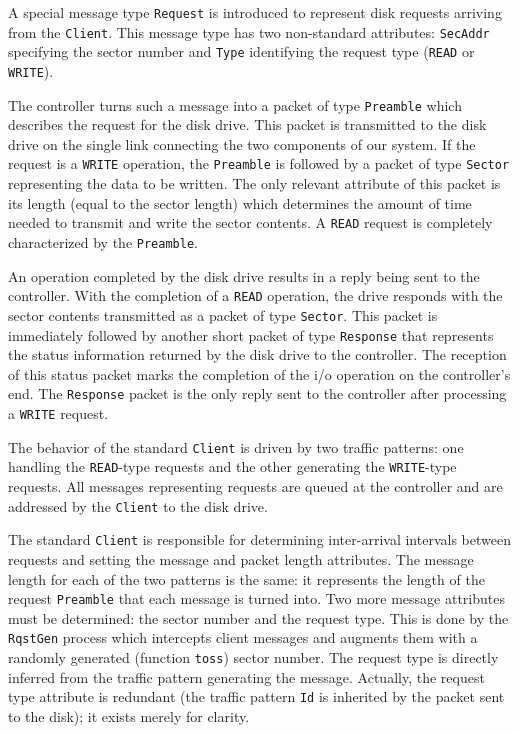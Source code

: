 A special message type {\tt Request} is introduced to represent disk
requests arriving from the {\tt Client}.
This message type has two non-standard attributes:
{\tt SecAddr} specifying the sector number and {\tt Type} identifying the
request type ({\tt READ} or {\tt WRITE}).

The controller turns such a message into a packet of type {\tt Preamble}
which describes the request for the disk drive.
This packet is transmitted to the disk drive on the single link
connecting the two components of our system.
If the request is a {\tt WRITE} operation, the {\tt Preamble}
is followed by a packet of type {\tt Sector} representing the data to
be written.
The only relevant attribute of this packet is its length (equal to the
sector length) which determines the amount of time needed to transmit and
write the sector contents.
A {\tt READ} request is completely characterized by the {\tt Preamble}.

An operation completed by the disk drive results
in a reply being sent to the
controller.
With the completion of a {\tt READ} operation, the drive responds with
the sector contents transmitted as a packet of
type {\tt Sector}.
This packet is immediately followed by another short packet of type
{\tt Response} that represents the status information returned by the
disk drive to the controller.
The reception of this status packet marks the completion of the i/o
operation on the controller's end.
The {\tt Response} packet is the only reply sent to the controller
after processing a {\tt WRITE} request.

The behavior of the standard {\tt Client} is driven by two traffic patterns:
one handling the {\tt READ}-type requests and the other generating
the {\tt WRITE}-type requests.
All messages representing requests are queued at the controller and are
addressed by the {\tt Client} to the disk drive.

The standard {\tt Client} is responsible for determining inter-arrival intervals
between requests and setting the message and packet length attributes.
The message length for each of the two patterns is the same: it represents
the length of the request {\tt Preamble} that each message is turned into.
Two more message attributes must be determined:
the sector number and the request type.
This is done by the {\tt RqstGen} process which intercepts client messages
and augments them with a randomly generated (function {\tt toss}) sector
number.
The request type is directly inferred from the traffic pattern generating
the message.
Actually, the request type attribute is redundant (the traffic pattern
{\tt Id} is inherited by the packet sent to the disk); it exists merely for
clarity.

